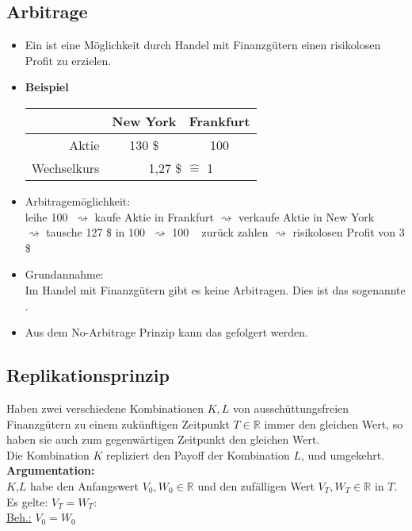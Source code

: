 \subsection{Arbitrage} %
\label{sub:arbitrage}
\begin{itemize}
	\item Ein  ist eine Möglichkeit durch Handel mit Finanzgütern einen risikolosen Profit zu erzielen.
	\item \textbf{Beispiel} \\
	\begin{tabular}{r | c c}
		& New York & Frankfurt \\
		\hline
		Aktie & 130 \$ & 100 \texteuro \\
		Wechselkurs & \multicolumn{2}{c}{1,27 \$ $\mathrel{\hat=}$ 1 \texteuro } \\
	\end{tabular}
	\item Arbitragemöglichkeit: \\
	leihe 100 \texteuro $~\rightsquigarrow$ kaufe Aktie in Frankfurt $\rightsquigarrow$ verkaufe Aktie in New York\\ $\rightsquigarrow$ tausche 127 \$ in 100 \texteuro  $~\rightsquigarrow$ 100 \texteuro~  zurück zahlen $\rightsquigarrow$ risikolosen Profit von 3 \$
	\item Grundannahme: \\
		Im Handel mit Finanzgütern gibt es keine Arbitragen. Dies ist das sogenannte . 
	\item Aus dem No-Arbitrage Prinzip kann das  gefolgert werden.	
\end{itemize}

\subsection{Replikationsprinzip}
\label{sub: replikationsprinzip}
Haben zwei verschiedene Kombinationen $K,L$ von ausschüttungsfreien Finanzgütern zu einem zukünftigen Zeitpunkt $T \in \mathds{R}$ immer den gleichen Wert, so haben sie auch zum gegenwärtigen Zeitpunkt den gleichen Wert. \\
Die Kombination $K$ repliziert den Payoff der Kombination $L$, und umgekehrt.\\
\textbf{Argumentation:}\\
$K$,$L$ habe den Anfangswert $V_0,W_0 \in \mathds{R}$ und den zufälligen Wert $V_T,W_T \in \mathds{R}$ in $T$. \\
Es gelte: $V_T = W_T$: \\
\underline{Beh.:} $V_0 = W_0$ \\

